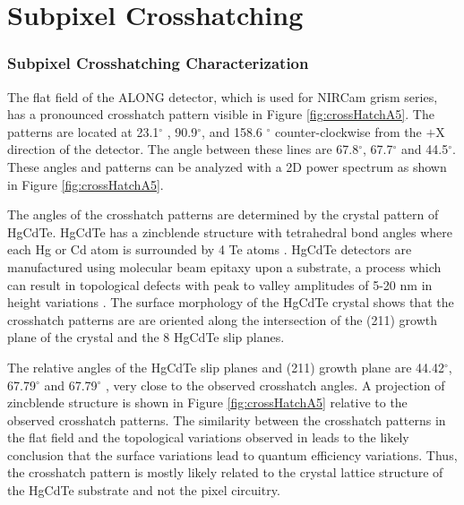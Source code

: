 \documentclass{aastex62}
\newcommand{\degree}{^\circ}
\begin{document}
\clearpage
\section{Subpixel Crosshatching}

\subsubsection{Subpixel Crosshatching Characterization}
The flat field of the ALONG detector, which is used for NIRCam grism series, has a pronounced crosshatch pattern visible in Figure \ref{fig:crossHatchA5}.
The patterns are located at 23.1$\degree$ , 90.9$\degree$, and 158.6 $\degree$ counter-clockwise from the $+$X direction of the detector.
The angle between these lines are 67.8$\degree$, 67.7$\degree$ and 44.5$\degree$.
These angles and patterns can be analyzed with a 2D power spectrum as shown in Figure \ref{fig:crossHatchA5}.

The angles of the crosshatch patterns are determined by the crystal pattern of HgCdTe.
HgCdTe has a zincblende structure with tetrahedral bond angles where each Hg or Cd atom is surrounded by 4 Te atoms \citep{gemain2012mercVacanciesHgCdTe}.
HgCdTe detectors are manufactured using molecular beam epitaxy upon a substrate, a process which can result in topological defects with peak to valley amplitudes of 5-20 nm in height variations \citep{chang2008surfaceMorphologyHgCdTe}.
The surface morphology of the HgCdTe crystal shows that the crosshatch patterns are are oriented along the intersection of the (211) growth plane of the crystal and the 8 HgCdTe slip planes.

The relative angles of the HgCdTe slip planes and (211) growth plane are 44.42$\degree$, 67.79$\degree$ and 67.79$\degree$ \citep{chang2008surfaceMorphologyHgCdTe}, very close to the observed crosshatch angles.
A projection of zincblende structure is shown in Figure \ref{fig:crossHatchA5} relative to the observed crosshatch patterns.
The similarity between the crosshatch patterns in the flat field and the topological variations observed in \citet{chang2008surfaceMorphologyHgCdTe} leads to the likely conclusion that the surface variations lead to quantum efficiency variations.
Thus, the crosshatch pattern is mostly likely related to the crystal lattice structure of the HgCdTe substrate and not the pixel circuitry.
\end{document}
